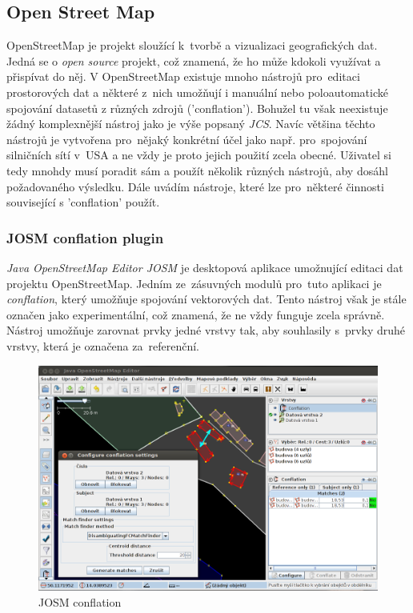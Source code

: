 
\subsection{Open Street Map}

OpenStreetMap je projekt sloužící k~tvorbě a vizualizaci geografických dat. Jedná se o \textit{open source} projekt, což znamená, že ho může kdokoli využívat a přispívat do něj.
V OpenStreetMap existuje mnoho nástrojů pro~editaci prostorových dat a některé z~nich umožňují i manuální nebo poloautomatické spojování datasetů z různých zdrojů ('conflation').
Bohužel tu však neexistuje žádný komplexnější nástroj jako je výše popsaný \textit{JCS}. Navíc většina těchto nástrojů je vytvořena pro~nějaký konkrétní účel jako např. 
pro~spojování silničních sítí v~USA a ne vždy je proto jejich použití zcela obecné. Uživatel si tedy mnohdy musí poradit sám a použít několik různých nástrojů, aby dosáhl
požadovaného výsledku. Dále uvádím nástroje, které lze pro~některé činnosti související s 'conflation' použít. 

\subsubsection{JOSM conflation plugin}

\textit{Java OpenStreetMap Editor JOSM} je desktopová aplikace umožnující editaci dat projektu OpenStreetMap. Jedním ze~zásuvných modulů pro~tuto aplikaci je \textit{conflation},
který umožňuje spojování vektorových dat. Tento nástroj však je stále označen jako experimentální, což znamená, že ne vždy funguje zcela správně. Nástroj umožňuje zarovnat
prvky jedné vrstvy tak, aby souhlasily s~prvky druhé vrstvy, která je označena za~referenční. 

\label{josmpic}
  \begin{figure}[hbt]
    \centering
      \includegraphics[width=350pt]{./pictures/josm.png}
      \caption{JOSM conflation}
      \label{fig:josm}
  \end{figure} 

